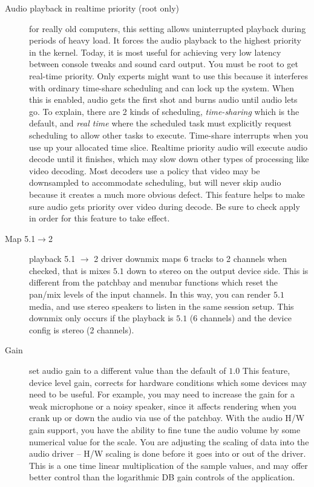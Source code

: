 \begin{description}
    \item[Audio playback in realtime priority (root only)] for really old computers, this setting allows uninterrupted playback during periods of heavy load. It forces the audio playback to the highest priority in the kernel. Today, it is most useful for achieving very low latency between console tweaks and sound card output. You must be root to get real-time priority. Only experts might want to use this because it interferes with ordinary time-share scheduling and can lock up the system.  When this is enabled, audio gets the first shot and burns audio until audio lets go. To explain, there are 2 kinds of scheduling, \textit{time-sharing} which is the default, and \textit{real time} where the scheduled task must explicitly request scheduling to allow other tasks to execute.  Time-share interrupts when you use up your allocated time slice.  Realtime priority audio will execute audio decode until it finishes, which may slow down other types of processing like video decoding.  Most decoders use a policy that video may be downsampled to accommodate scheduling, but will never skip audio because it creates a much more obvious defect.  This feature helps to make sure audio gets priority over video during decode. Be sure to check apply in order for this feature to take effect.
    \item[Map 5.1$\rightarrow$2] playback 5.1 $\rightarrow$ 2 driver downmix maps 6 tracks to 2 channels when checked, that is mixes $5.1$ down to stereo on the output device side.  This is different from the patchbay and menubar functions which reset the pan/mix levels of the input channels.  In this way, you can render $5.1$ media, and use stereo speakers to listen in the same session setup.  This downmix only occurs if the playback is $5.1$ (6 channels) and the device config is stereo (2 channels).
    \item[Gain] set audio gain to a different value than the default of $1.0$ This feature, device level gain, corrects for hardware conditions which some devices may need to be useful.  For example, you may need to increase the gain for a weak microphone or a noisy speaker, since it affects rendering when you crank up or down the audio via use of the patchbay.  With the audio H/W gain support, you have the ability to fine tune the audio volume by some numerical value for the scale.  You are adjusting the scaling of data into the audio driver -- H/W scaling is done before it goes into or out of the driver.  This is a one time linear multiplication of the sample values, and may offer better control than the logarithmic DB gain controls of the application.

\end{description}
